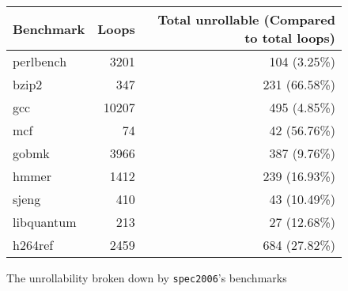 \begin{figure}[H]
    \begin{center}
        \begin{tabular}{lrr}
            \toprule
            Benchmark & Loops & Total unrollable (Compared to total loops)\\
            \midrule
            perlbench & 3201 & 104 (3.25\%)\\
            bzip2 & 347 & 231 (66.58\%)\\
            gcc & 10207  & 495 (4.85\%)\\
            mcf & 74 & 42 (56.76\%)\\
            gobmk & 3966 & 387 (9.76\%)\\
            hmmer & 1412 & 239 (16.93\%)\\
            sjeng & 410 & 43 (10.49\%) \\
            libquantum & 213 & 27 (12.68\%)\\
            h264ref & 2459 & 684 (27.82\%)\\
            \bottomrule
        \end{tabular}
    \end{center}
    \caption{The unrollability broken down by \texttt{spec2006}'s benchmarks}
    \label{fig:eval:unrollability:cmp-unrollability-bench}
\end{figure}